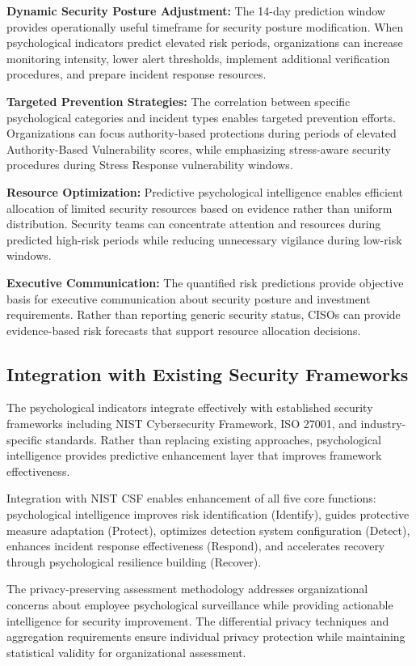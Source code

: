 \documentclass[10pt, twocolumn]{article}
\begin{document}
\textbf{Dynamic Security Posture Adjustment:} The 14-day prediction window provides operationally useful timeframe for security posture modification. When psychological indicators predict elevated risk periods, organizations can increase monitoring intensity, lower alert thresholds, implement additional verification procedures, and prepare incident response resources.

\textbf{Targeted Prevention Strategies:} The correlation between specific psychological categories and incident types enables targeted prevention efforts. Organizations can focus authority-based protections during periods of elevated Authority-Based Vulnerability scores, while emphasizing stress-aware security procedures during Stress Response vulnerability windows.

\textbf{Resource Optimization:} Predictive psychological intelligence enables efficient allocation of limited security resources based on evidence rather than uniform distribution. Security teams can concentrate attention and resources during predicted high-risk periods while reducing unnecessary vigilance during low-risk windows.

\textbf{Executive Communication:} The quantified risk predictions provide objective basis for executive communication about security posture and investment requirements. Rather than reporting generic security status, CISOs can provide evidence-based risk forecasts that support resource allocation decisions.

\subsection{Integration with Existing Security Frameworks}

The psychological indicators integrate effectively with established security frameworks including NIST Cybersecurity Framework, ISO 27001, and industry-specific standards. Rather than replacing existing approaches, psychological intelligence provides predictive enhancement layer that improves framework effectiveness.

Integration with NIST CSF enables enhancement of all five core functions: psychological intelligence improves risk identification (Identify), guides protective measure adaptation (Protect), optimizes detection system configuration (Detect), enhances incident response effectiveness (Respond), and accelerates recovery through psychological resilience building (Recover).

The privacy-preserving assessment methodology addresses organizational concerns about employee psychological surveillance while providing actionable intelligence for security improvement. The differential privacy techniques and aggregation requirements ensure individual privacy protection while maintaining statistical validity for organizational assessment.
\end{document}
